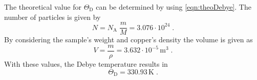

The theoretical value for $\Theta _{\text{D}}$ can be determined by using \autoref{eqn:theoDebye}.
The number of particles is given by 
\begin{equation*}
    N=N_{\text{A}}\; \frac{m}{M}=3.076 \cdot 10^{24}\; .
\end{equation*}
By considering the sample's weight and copper's density the volume is given as 
\begin{equation*}
    V=\frac{m}{\rho}=3.632 \cdot 10^{-5} \, \unit{\meter}^3\; .
\end{equation*}
With these values, the Debye temperature results in
\begin{equation*}
    \Theta_{\text{D}}=330.93\, \unit{\kelvin}\; .
\end{equation*}